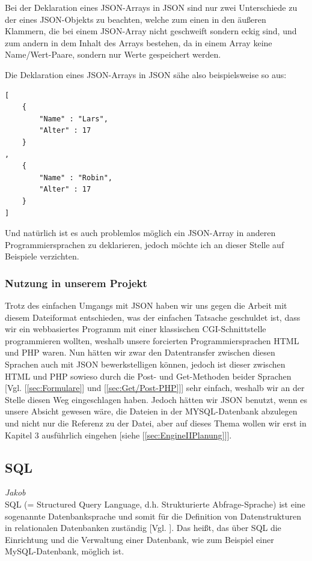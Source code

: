 \documentclass[12pt,a4paper,bibliography=totocnumbered,listof=totocnumbered]{scrartcl}
\begin{document}
Bei der Deklaration eines JSON-Arrays in JSON sind nur zwei Unterschiede zu der eines JSON-Objekts zu beachten, welche zum einen in den äußeren Klammern, die bei einem JSON-Array nicht geschweift sondern eckig sind, und zum andern in dem Inhalt des Arrays bestehen, da in einem Array keine Name/Wert-Paare, sondern nur Werte gespeichert werden.

\pagebreak
Die Deklaration eines JSON-Arrays in JSON sähe also beispielsweise so aus:
\\
\vspace{1em}
\begin{lstlisting}[caption=Klasse.json, label=lst:json-array]
[
	{
		"Name" : "Lars",
		"Alter" : 17
	}
,
	{
 		"Name" : "Robin",
 		"Alter" : 17
	}
]
\end{lstlisting}

Und natürlich ist es auch problemlos möglich ein JSON-Array in anderen Programmiersprachen zu deklarieren, jedoch möchte ich an dieser Stelle auf Beispiele verzichten.

\subsubsection{Nutzung in unserem Projekt}
Trotz des einfachen Umgangs mit JSON haben wir uns gegen die Arbeit mit diesem Dateiformat entschieden, was der einfachen Tatsache geschuldet ist, dass wir ein webbasiertes Programm mit einer klassischen CGI-Schnittstelle programmieren wollten, weshalb unsere forcierten Programmiersprachen HTML und PHP waren.
Nun hätten wir zwar den Datentransfer zwischen diesen Sprachen auch mit JSON bewerkstelligen können, jedoch ist dieser zwischen HTML und PHP sowieso durch die Post- und Get-Methoden beider Sprachen [Vgl. [\ref{sec:Formulare}] und [\ref{sec:Get/Post-PHP}]] sehr einfach, weshalb wir an der Stelle diesen Weg eingeschlagen haben.
Jedoch hätten wir JSON benutzt, wenn es unsere Absicht gewesen wäre, die Dateien in der MYSQL-Datenbank abzulegen und nicht nur die Referenz zu der Datei, aber auf dieses Thema wollen wir erst in Kapitel 3 ausführlich eingehen [siehe [\ref{sec:EngineIIPlanung}]].

\subsection{SQL}
\label{sec:SQL}
\emph{Jakob}\\
SQL (= Structured Query Language, d.h. Strukturierte Abfrage-Sprache) ist eine sogenannte \glqq Datenbanksprache\grqq{} und somit für die Definition von Datenstrukturen in relationalen Datenbanken zuständig [Vgl. \cite{wiki/SQL}].
Das heißt, das über SQL die Einrichtung und die Verwaltung einer Datenbank, wie zum Beispiel einer MySQL-Datenbank, möglich ist.
\end{document}
